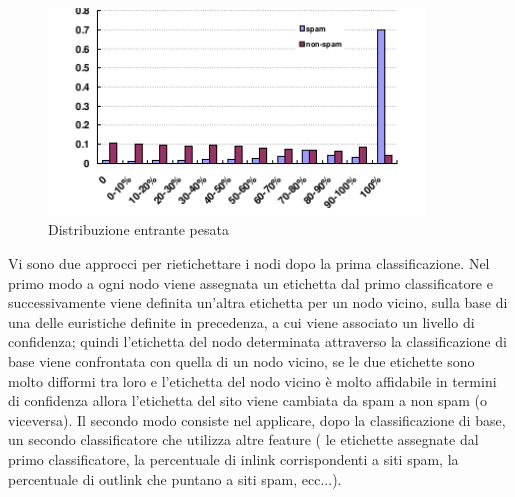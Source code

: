 \begin{itemize}
 \begin{figure}
 \centering
\includegraphics[width=10cm]{immagini/gan/immagine3.png}
\caption{Distribuzione entrante pesata}
\label{img:gan3}
\end{figure}
\end{itemize}
Vi sono due approcci per rietichettare i nodi dopo la prima classificazione. Nel primo modo a ogni nodo viene assegnata un etichetta dal primo classificatore e successivamente viene definita un'altra etichetta per un nodo vicino, sulla base di una delle euristiche definite in precedenza, a cui viene associato un livello di confidenza; quindi l'etichetta del nodo determinata attraverso la classificazione di base viene confrontata con quella di un nodo vicino, se le due etichette sono molto difformi tra loro e l'etichetta del nodo vicino è molto affidabile in termini di confidenza allora l’etichetta del sito viene cambiata da spam a non spam (o viceversa). Il secondo modo consiste nel applicare, dopo la classificazione di base, un secondo classificatore che utilizza altre feature ( le etichette assegnate dal primo classificatore, la percentuale di inlink corrispondenti a siti spam, la percentuale di outlink che puntano a siti spam, ecc...).

